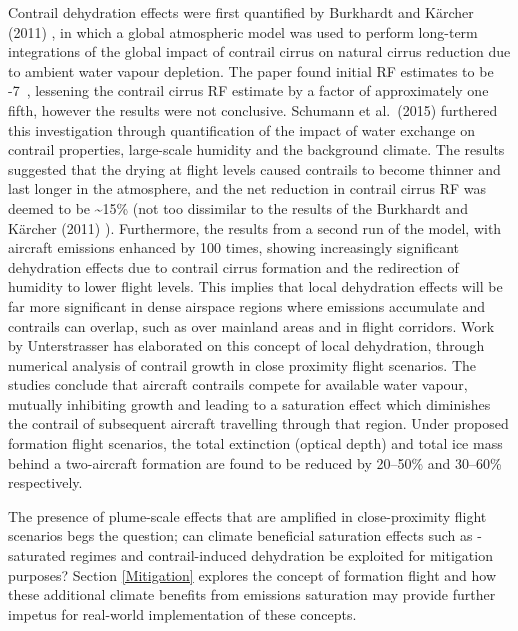 Contrail dehydration effects were first quantified by Burkhardt and K\"{a}rcher (2011) \cite{Burkhardt2011}, in which a global atmospheric model was used to perform long-term integrations of the global impact of contrail cirrus on natural cirrus reduction due to ambient water vapour depletion. The paper found initial RF estimates to be -7~, lessening the contrail cirrus RF estimate by a factor of approximately one fifth, however the results were not conclusive. Schumann et al.\ (2015) \cite{Schumann2015} furthered this investigation through quantification of the impact of water exchange on contrail properties, large-scale humidity and the background climate. The results suggested that the drying at flight levels caused contrails to become thinner and last longer in the atmosphere, and the net reduction in contrail cirrus RF was deemed to be \textasciitilde15\% (not too dissimilar to the results of the Burkhardt and K{\"a}rcher (2011) \cite{Burkhardt2011}). Furthermore, the results from a second run of the model, with aircraft emissions enhanced by 100 times, showing increasingly significant dehydration effects due to contrail cirrus formation and the redirection of humidity to lower flight levels. This implies that local dehydration effects will be far more significant in dense airspace regions where emissions accumulate and contrails can overlap, such as over mainland areas and in flight corridors. Work by Unterstrasser \cite{Unterstrasser2010, Unterstrasser2020} has elaborated on this concept of local dehydration, through numerical analysis of contrail growth in close proximity flight scenarios. The studies conclude that aircraft contrails compete for available water vapour, mutually inhibiting growth and leading to a saturation effect which diminishes the contrail of subsequent aircraft travelling through that region. Under proposed formation flight scenarios, the total extinction (optical depth) and total ice mass behind a two-aircraft formation are found to be reduced by 20--50\% and 30--60\% respectively.

The presence of plume-scale effects that are amplified in close-proximity flight scenarios begs the question; can climate beneficial saturation effects such as -saturated regimes and contrail-induced dehydration be exploited for mitigation purposes? Section \ref{Mitigation} explores the concept of formation flight and how these additional climate benefits from emissions saturation may provide further impetus for real-world implementation of these concepts.

